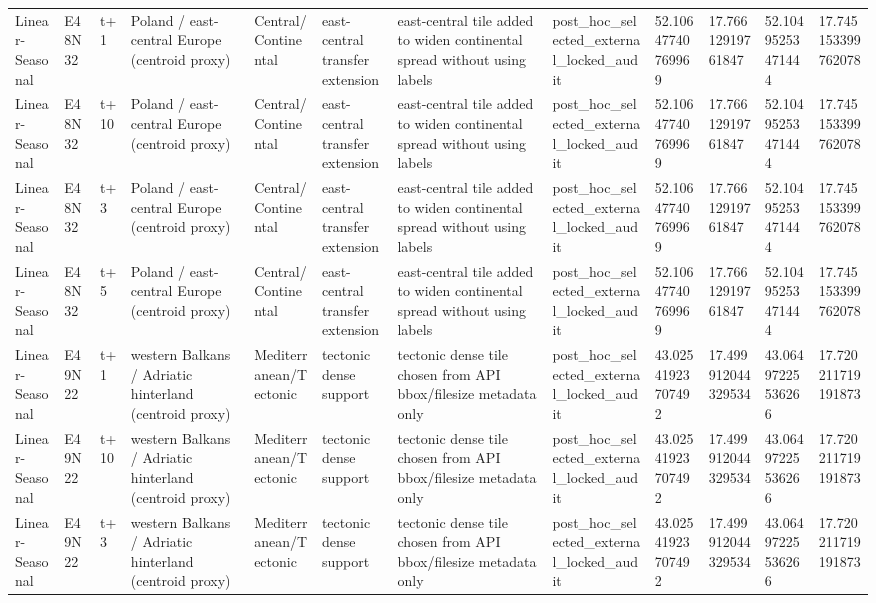 \begin{landscape}
\begin{longtable}{llllllllllll}
Linear-Seasonal & E48N32 & t+1 & Poland / east-central Europe (centroid proxy) & Central/Continental & east-central transfer extension & east-central tile added to widen continental spread without using labels & post\_hoc\_selected\_external\_locked\_audit & 52.10647740769969 & 17.76612919761847 & 52.10495253471444 & 17.745153399762078 \\
Linear-Seasonal & E48N32 & t+10 & Poland / east-central Europe (centroid proxy) & Central/Continental & east-central transfer extension & east-central tile added to widen continental spread without using labels & post\_hoc\_selected\_external\_locked\_audit & 52.10647740769969 & 17.76612919761847 & 52.10495253471444 & 17.745153399762078 \\
Linear-Seasonal & E48N32 & t+3 & Poland / east-central Europe (centroid proxy) & Central/Continental & east-central transfer extension & east-central tile added to widen continental spread without using labels & post\_hoc\_selected\_external\_locked\_audit & 52.10647740769969 & 17.76612919761847 & 52.10495253471444 & 17.745153399762078 \\
Linear-Seasonal & E48N32 & t+5 & Poland / east-central Europe (centroid proxy) & Central/Continental & east-central transfer extension & east-central tile added to widen continental spread without using labels & post\_hoc\_selected\_external\_locked\_audit & 52.10647740769969 & 17.76612919761847 & 52.10495253471444 & 17.745153399762078 \\
Linear-Seasonal & E49N22 & t+1 & western Balkans / Adriatic hinterland (centroid proxy) & Mediterranean/Tectonic & tectonic dense support & tectonic dense tile chosen from API bbox/filesize metadata only & post\_hoc\_selected\_external\_locked\_audit & 43.02541923707492 & 17.499912044329534 & 43.06497225536266 & 17.720211719191873 \\
Linear-Seasonal & E49N22 & t+10 & western Balkans / Adriatic hinterland (centroid proxy) & Mediterranean/Tectonic & tectonic dense support & tectonic dense tile chosen from API bbox/filesize metadata only & post\_hoc\_selected\_external\_locked\_audit & 43.02541923707492 & 17.499912044329534 & 43.06497225536266 & 17.720211719191873 \\
Linear-Seasonal & E49N22 & t+3 & western Balkans / Adriatic hinterland (centroid proxy) & Mediterranean/Tectonic & tectonic dense support & tectonic dense tile chosen from API bbox/filesize metadata only & post\_hoc\_selected\_external\_locked\_audit & 43.02541923707492 & 17.499912044329534 & 43.06497225536266 & 17.720211719191873 \\

\end{longtable}
\end{landscape}
